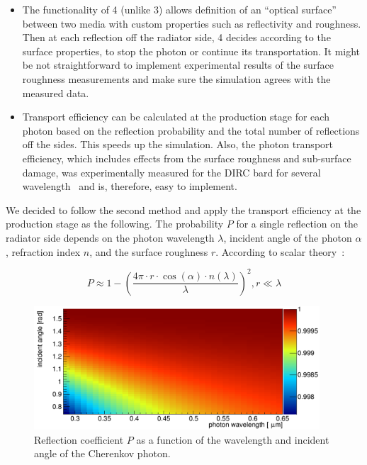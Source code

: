 \begin{itemize}
\item The functionality of {\geant}4 (unlike {\geant}3) allows definition of an ``optical surface'' between two media with custom properties such as reflectivity and roughness. Then at each reflection off the radiator side, {\geant}4 decides according to the surface properties, to stop the photon or continue its transportation. It might be not straightforward to implement experimental results of the surface roughness measurements and make sure the simulation agrees with the measured data.
\item Transport efficiency can be calculated at the production stage for each photon based on the reflection probability and the total number of reflections off the sides. This speeds up the simulation. Also, the photon transport efficiency, which includes effects from the surface roughness and sub-surface damage, was experimentally measured for the \babar DIRC bard for several wavelength~\cite{roughness} and is, therefore, easy to implement.
\end{itemize}

We decided to follow the second method and apply the transport efficiency at the production stage as the following. The probability $P$ for a single reflection on the radiator side depends on the photon wavelength $\lambda$, incident angle of the photon $\alpha$, refraction index $n$, and the surface roughness $r$. According to scalar theory~\cite{scalar}:

\begin{equation}
P \approx  1 - \left( \frac{4\pi \cdot r \cdot \cos(\alpha) \cdot n(\lambda)}{\lambda} \right)^{2}, r \ll \lambda
\end{equation}

\begin{figure}[!h]
\centering
\includegraphics[width=0.95\textwidth]{pics/psurf.png}
\caption{\label{pic:sur}
Reflection coefficient $P$ as a function of the wavelength and incident angle of the Cherenkov photon.
}
\end{figure}

